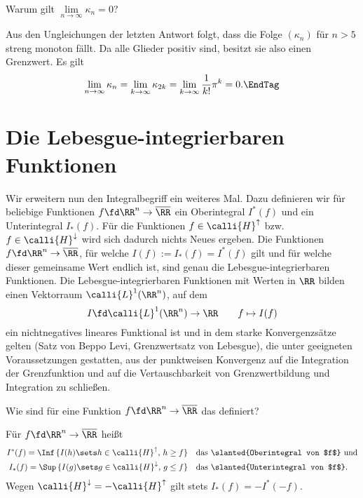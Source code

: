 \begin{frage}
  Warum gilt $\lim\limits_{n\to\infty}\kappa_n=0$?
\end{frage}

\begin{antwort}
  Aus den Ungleichungen der letzten Antwort folgt, 
  dass die Folge $(\kappa_n)$ f\"ur $n>5$ streng monoton f\"allt. 
  Da alle Glieder positiv sind, besitzt sie also einen Grenzwert. Es gilt 
  \[
  \lim_{n\to\infty} \kappa_n = \lim_{k\to\infty } \kappa_{2k} = 
  \lim_{k\to\infty}\frac{1}{k!}\pi^k = 0.
  \EndTag
  \]
\end{antwort} 

\section{Die Lebesgue-integrierbaren Funktionen}

Wir erweitern nun den Integralbegriff ein weiteres Mal. Dazu definieren 
wir f\"ur beliebige Funktionen $f\fd\RR^n \to\overline{\RR}$ ein Oberintegral 
$I^*(f)$ und ein Unterintegral $I_* (f)$. F\"ur die Funktionen 
$f\in\calli{H}^\uparrow$ bzw. $f\in\calli{H}^\downarrow$ 
wird sich dadurch nichts Neues ergeben. Die Funktionen 
$f\fd \RR^n  \to\overline{\RR}$, f\"ur welche 
$I(f):= I_*(f)=I^*(f)$ gilt und f\"ur welche dieser gemeinsame Wert 
endlich ist, sind genau die Lebesgue-integrierbaren Funktionen. 
Die Lebesgue-integrierbaren Funktionen 
mit Werten in $\RR$ 
bilden einen Vektorraum $\calli{L}^1 ( \RR^n )$, 
auf dem
\[
I\fd \calli{L}^1 (\RR^n)\to\RR \qquad 
f \mapsto I(f)
\]
ein nichtnegatives lineares Funktional ist und in dem 
starke Konvergenzs\"atze gelten 
(Satz von Beppo Levi, Grenzwertsatz von Lebesgue), die unter 
geeigneten Voraussetzungen 
gestatten, aus der punktweisen Konvergenz 
auf die Integration der Grenzfunktion und 
auf die Vertauschbarkeit von Grenzwertbildung und 
Integration zu schlie{\ss}en.   

\begin{frage}
  Wie sind f\"ur eine Funktion $f\fd \RR^n\to\overline{\RR}$ das 
   definiert?
\end{frage}

\begin{antwort}
  F\"ur $f\fd\RR^n\to\overline{\RR}$ hei{\ss}t 
  \begin{align*}
    I^*(f) = \Inf\, \{ I(h)\sets h\in\calli{H}^\uparrow,\, h\ge f \}
    & \quad\text{das \slanted{Oberintegral von $f$} und} \\
    I_*(f) = \Sup\, \{ I(g)\sets g\in\calli{H}^\downarrow,\, g\le f \}
    & \quad\text{das \slanted{Unterintegral von $f$}}.
  \end{align*}
  Wegen $\calli{H}^\downarrow = - \calli{H}^\uparrow $ gilt 
  stets $I_*(f)= -I^*(-f)$. \AntEnd
\end{antwort} 

